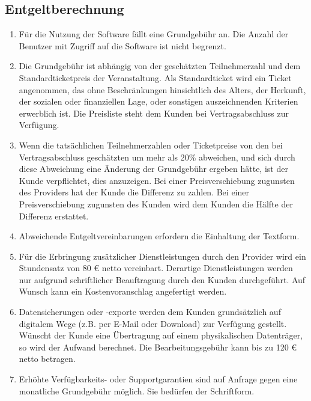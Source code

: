 \documentclass{terms}
\begin{document}
\subsection{Entgeltberechnung}
\begin{enumerate}
\item Für die Nutzung der Software fällt eine Grundgebühr an.
      Die Anzahl der Benutzer mit Zugriff auf die Software ist nicht begrenzt.
\item Die Grundgebühr ist abhängig von der geschätzten Teilnehmerzahl und dem Standardticketpreis der Veranstaltung.
      Als Standardticket wird ein Ticket angenommen, das ohne Beschränkungen hinsichtlich des Alters, der Herkunft, der sozialen oder finanziellen Lage, oder sonstigen auszeichnenden Kriterien erwerblich ist.
      Die Preisliste steht dem Kunden bei Vertragsabschluss zur Verfügung.
\item Wenn die tatsächlichen Teilnehmerzahlen oder Ticketpreise von den bei Vertragsabschluss geschätzten um mehr als 20\% abweichen, und sich durch diese Abweichung eine Änderung der Grundgebühr ergeben hätte, ist der Kunde verpflichtet, dies anzuzeigen.
      Bei einer Preisverschiebung zugunsten des Providers hat der Kunde die Differenz zu zahlen.
      Bei einer Preisverschiebung zugunsten des Kunden wird dem Kunden die Hälfte der Differenz erstattet.
\item Abweichende Entgeltvereinbarungen erfordern die Einhaltung der Textform.
\item Für die Erbringung zusätzlicher Dienstleistungen durch den Provider wird ein Stundensatz von 80 € netto vereinbart.
      Derartige Dienstleistungen werden nur aufgrund schriftlicher Beauftragung durch den Kunden durchgeführt.
      Auf Wunsch kann ein Kostenvoranschlag angefertigt werden.
\item Datensicherungen oder -exporte werden dem Kunden grundsätzlich auf digitalem Wege (z.B. per E-Mail oder Download) zur Verfügung gestellt.
      Wünscht der Kunde eine Übertragung auf einem physikalischen Datenträger, so wird der Aufwand berechnet.
      Die Bearbeitungsgebühr kann bis zu 120 € netto betragen.
\item Erhöhte Verfügbarkeits- oder Supportgarantien sind auf Anfrage gegen eine monatliche Grundgebühr möglich.
      Sie bedürfen der Schriftform.
\end{enumerate}
\end{document}
